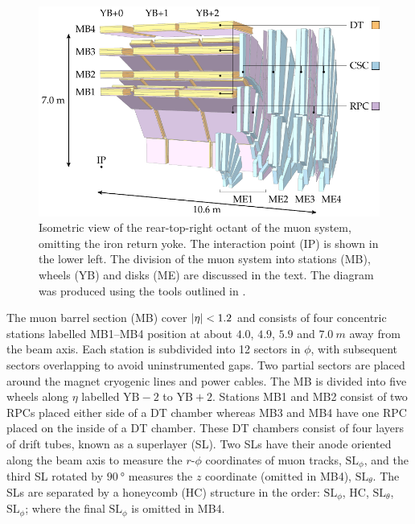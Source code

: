 \begin{figure}[htb]
    \centering
    \includegraphics{diagrams/tikz/cms/annotated/cms_muon.pdf}
    \caption[Isometric view of an octant of the CMS muon systems.]{
        Isometric view of the rear-top-right octant of the muon system, omitting the iron return yoke. The interaction point (IP) is shown in the lower left. The division of the muon system into stations (MB), wheels (YB) and disks (ME) are discussed in the text. The diagram was produced using the tools outlined in \cite{Sakuma:2013jqa}.
    }
    \label{fig:cms-muon}
\end{figure}

The muon barrel section (MB) cover ${|\eta|<1.2}$ and consists of four concentric stations labelled MB1--MB4 position at about $4.0$, $4.9$, $5.9$ and ${\SI{7.0}{m}}$ away from the beam axis. Each station is subdivided into 12 sectors in $\phi$, with subsequent sectors overlapping to avoid uninstrumented gaps. Two partial sectors are placed around the magnet cryogenic lines and power cables. The MB is divided into five wheels along $\eta$ labelled $\mathrm{YB}-2$ to $\mathrm{YB}+2$. Stations MB1 and MB2 consist of two RPCs placed either side of a DT chamber whereas MB3 and MB4 have one RPC placed on the inside of a DT chamber. These DT chambers consist of four layers of drift tubes, known as a superlayer (SL). Two SLs have their anode oriented along the beam axis to measure the $r$-$\phi$ coordinates of muon tracks, $\mathrm{SL}_{\phi}$, and the third SL rotated by ${\SI{90}{\degree}}$ measures the $z$ coordinate (omitted in MB4), $\mathrm{SL}_{\theta}$. The SLs are separated by a honeycomb (HC) structure in the order: $\mathrm{SL}_{\phi}$, HC, $\mathrm{SL}_{\theta}$, $\mathrm{SL}_{\phi}$; where the final $\mathrm{SL}_{\phi}$ is omitted in MB4.

